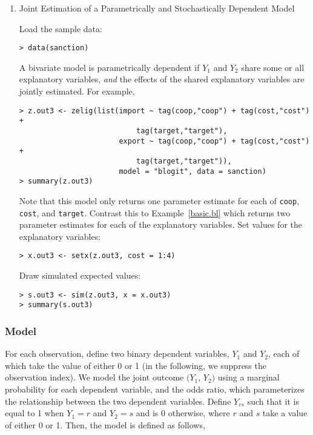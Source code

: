 \begin{enumerate}
\item Joint Estimation of a Parametrically and Stochastically
Dependent Model 
\label{pdep.l}
  
Load the sample data:  
\begin{verbatim}
> data(sanction)
\end{verbatim}
A bivariate model is parametrically dependent if $Y_1$ and $Y_2$ share
some or all explanatory variables, {\it and} the effects of the shared
explanatory variables are jointly estimated.  For example,
\begin{verbatim}
> z.out3 <- zelig(list(import ~ tag(coop,"coop") + tag(cost,"cost") + 
                           tag(target,"target"), 
                       export ~ tag(coop,"coop") + tag(cost,"cost") + 
                           tag(target,"target")), 
                       model = "blogit", data = sanction)
> summary(z.out3)
\end{verbatim}
Note that this model only returns one parameter estimate for each of
{\tt coop}, {\tt cost}, and {\tt target}.  Contrast this to
Example~\ref{basic.bl} which returns two parameter estimates for each
of the explanatory variables.  \newline \newline Set values for the
explanatory variables:
\begin{verbatim}
> x.out3 <- setx(z.out3, cost = 1:4)
\end{verbatim} 
Draw simulated expected values:  
\begin{verbatim}
> s.out3 <- sim(z.out3, x = x.out3)
> summary(s.out3)
\end{verbatim}

\end{enumerate}

\subsubsection{Model}

For each observation, define two binary dependent variables, $Y_1$ and
$Y_2$, each of which take the value of either 0 or 1 (in the
following, we suppress the observation index).  We model the joint
outcome $(Y_1$, $Y_2)$ using a marginal probability for each dependent
variable, and the odds ratio, which parameterizes the relationship
between the two dependent variables. Define $Y_{rs}$ such that it is
equal to 1 when $Y_1=r$ and $Y_2=s$ and is 0 otherwise, where $r$ and
$s$ take a value of either 0 or 1. Then, the model is defined as follows,

